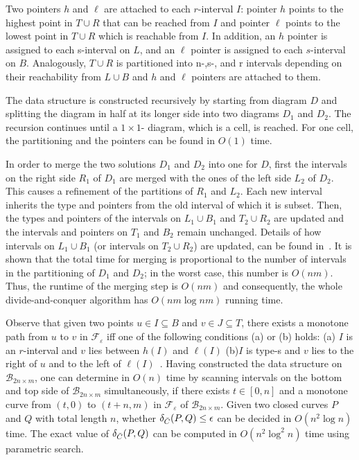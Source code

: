 \documentclass[12pt]{dalthesis}
\newcommand{\eps}{\varepsilon}
\newcommand{\CF}{{\mathscr F}}
\newcommand{\CB}{{\mathscr B}}
\newcommand{\BNNM}{\CB_{2n \times m}}
\newcommand{\Feps}{\CF_\eps}
\begin{document}
Two pointers $h$ and $\ell$ are attached
to each $r$-interval $I$:
pointer $h$ points to the highest point in $T \cup R$ that can be reached    
from $I$ and pointer $\ell$ points to
 the lowest point in  $T \cup R$ which is reachable from $I$. In addition, 
an $h$ pointer is assigned to each s-interval on $L$, and
an $\ell$ pointer is assigned to each  $s$-interval on $B$. Analogously, 
$T \cup R$ is partitioned into n-,s-, and r intervals depending on their reachability from 
$L \cup B$ and $h$ and $\ell$ pointers are attached to them. 

The data structure is constructed 
recursively by starting from diagram $D$
and splitting the diagram in half at its longer side into two diagrams 
$D_1$ and $D_2$. The recursion continues until 
 a $1 \times 1$- diagram, which is a cell, is reached.
For one cell, the partitioning and the pointers  can be found in $O(1)$ time. 

In order to merge the two solutions $D_1$ and $D_2$ 
into one for $D$, first the intervals on the
right side $R_1$ of $D_1$ are merged with the ones of the left side $L_2$ of $D_2$.
This causes a refinement of the partitions of $R_1$ and $L_2$. Each new 
interval inherits the type and pointers from the old interval of which it is 
subset. Then, the types and  pointers of the intervals on $L_1 \cup B_1$ and $T_2 \cup R_2$ are updated and the intervals and pointers on $T_1$ and $B_2$ remain unchanged.
Details of how intervals on $L_1 \cup B_1$ (or intervals on $T_2 \cup R_2$) 
are updated, can be found in~\cite{AltG95}. 
It is shown that the total time for merging is proportional to 
the number of intervals in the partitioning of $D_1$ and $D_2$; 
in the worst case, this number is 
 $O(nm)$. Thus, the runtime of the merging step is $O(nm)$
and consequently, the whole divide-and-conquer algorithm has $O(nm \log nm)$ running time.

Observe that given two points $u \in I \subseteq B$ and $v \in J \subseteq T$,
there exists a monotone path from $u$ to $v$ in $\Feps$ 	iff one of the 
following conditions (a) or (b) holds: 
(a) $I$ is an $r$-interval and $v$ lies between $h(I)$ and $\ell(I)$ 
(b)$I$ is type-s and $v$ lies to the right of $u$ and to the left of $\ell(I)$~\cite{AltG95}.
Having constructed the data structure on $\BNNM$, 
one can determine in $O(n)$ time by scanning intervals on the bottom and top 
side of $\BNNM$ simultaneously, if there exists $t \in [0,n]$  and a monotone curve from
$(t,0)$ to $(t+n,m)$ in $\Feps$ of $\BNNM$.
Given two closed curves $P$ and $Q$ with total length $n$, 
whether $\delta_{\bar{C}}(P,Q) \le \epsilon$
can be decided in $O(n^2 \log n)$ time. 
The exact value of 
$\delta_{\bar{C}}(P,Q)$ can be computed in $O(n^2 \log^2 n)$ time using parametric search.
\end{document}

